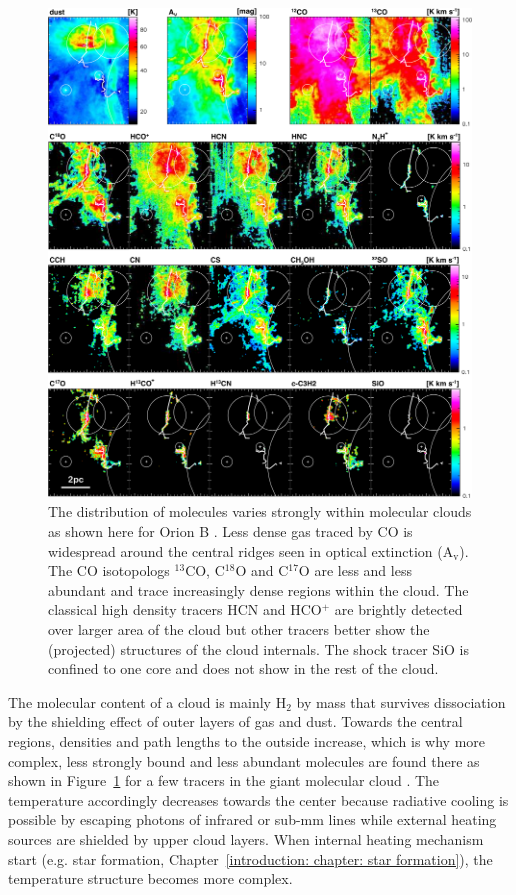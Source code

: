\begin{figure}
    \centering
    \includegraphics[width=\textwidth]{images/chapters/introduction/ism/Pety+16_overview.pdf}
    \caption[Distribution of molecules in Orion]{The distribution of molecules varies strongly within molecular clouds as shown here for Orion B \citep[adapted from figure 2]{2017A&A...599A..98P}. Less dense gas traced by CO is widespread around the central ridges seen in optical extinction (A$_\mathrm{v}$). The CO isotopologs $^{13}$CO, C$^{18}$O and C$^{17}$O are less and less abundant and trace increasingly dense regions within the cloud. The classical high density tracers HCN and HCO$^+$ are brightly detected over larger area of the cloud but other tracers better show the (projected) structures of the cloud internals. The shock tracer SiO is confined to one core and does not show in the rest of the cloud.}
    \label{introduction: figure: molecular cloud molecule distribution}
\end{figure}

The molecular content of a cloud is mainly H$_2$ by mass that survives dissociation by the shielding effect of outer layers of gas and dust. Towards the central regions, densities and path lengths to the outside increase, which is why more complex, less strongly bound and less abundant molecules are found there as shown in Figure~\ref{introduction: figure: molecular cloud molecule distribution} for a few tracers in the giant molecular cloud  \citep{2017A&A...599A..98P}. The temperature accordingly decreases towards the center because radiative cooling is possible by escaping photons of infrared or sub-mm lines while external heating sources are shielded by upper cloud layers. When internal heating mechanism start (e.g. star formation, Chapter~\ref{introduction: chapter: star formation}), the temperature structure becomes more complex.

